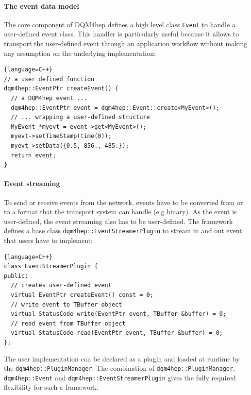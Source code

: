\documentclass{webofc}
\begin{document}
\paragraph{The event data model}

The core component of DQM4hep defines a high level class \texttt{Event} to handle a user-defined event class.
This handler is particularly useful because it allows to transport the user-defined event through an application
workflow without making any assumption on the underlying implementation:

\begin{lstlisting}{language=C++}
// a user defined function
dqm4hep::EventPtr createEvent() {
  // a DQM4hep event ...
  dqm4hep::EventPtr event = dqm4hep::Event::create<MyEvent>();
  // ... wrapping a user-defined structure
  MyEvent *myevt = event->get<MyEvent>();
  myevt->setTimeStamp(time(0));
  myevt->setData({0.5, 856., 485.});
  return event;
}
\end{lstlisting}

\paragraph{Event streaming}

To send or receive events from the network, events have to be converted from or to a format that the transport system can handle (e.g binary). 
As the event is user-defined, the event streaming also has to be user-defined. 
The framework defines a base class \texttt{dqm4hep::EventStreamerPlugin} to stream in and out event that users have to implement:

\begin{lstlisting}{language=C++}
class EventStreamerPlugin {
public:
  // creates user-defined event
  virtual EventPtr createEvent() const = 0;
  // write event to TBuffer object
  virtual StatusCode write(EventPtr event, TBuffer &buffer) = 0;
  // read event from TBuffer object
  virtual StatusCode read(EventPtr event, TBuffer &buffer) = 0;
};
\end{lstlisting}

The user implementation can be declared as a plugin and loaded at runtime by the \texttt{dqm4hep::PluginManager}. 
The combination of \texttt{dqm4hep::PluginManager}, \texttt{dqm4hep::Event} and \texttt{dqm4hep::EventStreamerPlugin} gives the 
fully required flexibility for such a framework. 
\end{document}
